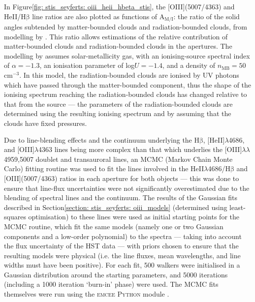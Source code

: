 In Figure\;\ref{fig: stis_seyferts: oiii_heii_hbeta_stis}, the [OIII](5007/4363) and HeII/H$\mathrm{\beta}$ line ratios are also plotted as functions of A$_\mathrm{M/I}$: the ratio of the solid angles subtended by matter-bounded clouds and radiation-bounded clouds, from modelling by \citet{Binette1996}. This ratio allows estimations of the relative contribution of matter-bounded clouds and radiation-bounded clouds in the apertures. The modelling by \citet{Binette1996} assumes solar-metallicity gas, with an ionising-source spectral index of $\alpha=-1.3$, an ionisation parameter of log\;$U=-1.4$, and a density of $n_\mathrm{MB}=50$\;cm$^{-3}$. In this model, the radiation-bounded clouds are ionised by UV photons which have passed through the matter-bounded component, thus the shape of the ionising spectrum reaching the radiation-bounded clouds has changed relative to that from the source --- the parameters of the radiation-bounded clouds are determined using the resulting ionising spectrum and by assuming that the clouds have fixed pressures.

Due to line-blending effects and the continuum underlying the H$\mathrm{\beta}$, [HeII]$\lambda$4686, and [OIII]$\lambda$4363 lines being more complex than that which underlies the [OIII]$\lambda\lambda$4959,5007 doublet and transauroral lines, an MCMC (Markov Chain Monte Carlo) fitting routine was used to fit the lines involved in the HeII$\lambda$4686/H$\mathrm{\beta}$ and [OIII](5007/4363) ratios in each aperture for both objects --- this was done to ensure that line-flux uncertainties were not significantly overestimated due to the blending of spectral lines and the continuum. The results of the Gaussian fits described in Section\;\ref{section: stis_seyferts: oiii_models} (determined using least-squares optimisation) to these lines were used as initial starting points for the MCMC routine, which fit the same models (namely one or two Gaussian components and a low-order polynomial) to the spectra --- taking into account the flux uncertainty of the HST data --- with priors chosen to ensure that the resulting models were physical (i.e. the line fluxes, mean wavelengths, and line widths must have been positive). For each fit, 500 walkers were initialised in a Gaussian distribution around the starting parameters, and 5000 iterations (including a 1000 iteration `burn-in' phase) were used. The MCMC fits themselves were run using the \textsc{emcee} \textsc{Python} module \citep{FormanMackey2013}.

